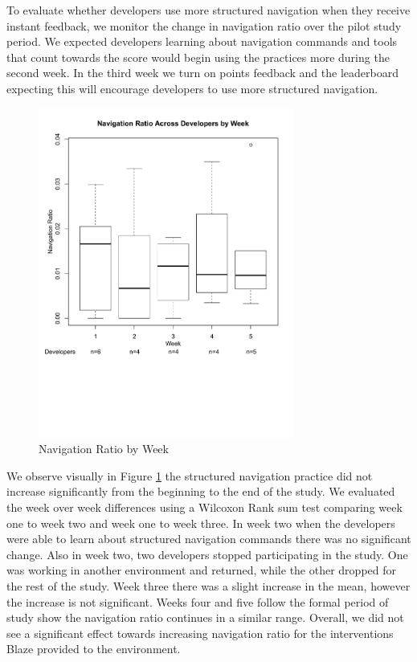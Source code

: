 \documentclass{sig-alternate}
\begin{document}
To evaluate whether developers use more structured navigation when they receive instant feedback, we monitor the change in navigation ratio over the pilot study period.   We expected developers learning about navigation commands and tools that count towards the score would begin using the practices more during the second week.  In the third week we turn on points feedback and the leaderboard expecting this will encourage developers to use more structured navigation.  

\begin{figure}
	\includegraphics[width=3.3in]{navratioboxplot_ann.pdf}
	\caption{Navigation Ratio by Week}
	\label{fig:navigationaverage}
\end{figure}

We observe visually in Figure \ref{fig:navigationaverage} the structured navigation practice did not increase significantly from the beginning to the end of the study.  We evaluated the week over week differences using a Wilcoxon Rank sum test \cite{RefWorks:118} comparing week one to week two and week one to week three.    In week two when the developers were able to learn about structured navigation commands there was no significant change.  Also in week two, two developers stopped participating in the study.  One was working in another environment and returned, while the other dropped for the rest of the study.  Week three there was a slight increase in the mean, however the increase is not significant.  Weeks four and five follow the formal period of study show the navigation ratio continues in a similar range.  Overall, we did not see a significant effect towards increasing navigation ratio for the interventions Blaze provided to the environment.    
\end{document}
